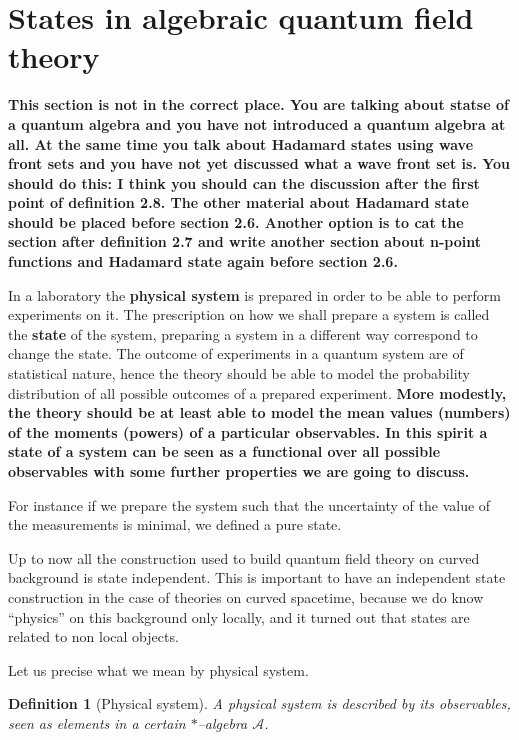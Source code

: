 \documentclass[11pt]{book}
\newcommand{\com}[1]{{\color{red}\bf #1}}
\newcommand{\Acal}{\mathcal{A}}
\theoremstyle{break}
\newtheorem{definition}{Definition}[chapter]
\begin{document}
\section{States in algebraic quantum field theory}
\label{p:STATES}

\com{This section is not in the correct place. You are talking about statse of a quantum algebra and you have not introduced a quantum algebra at all. At the same time you talk about Hadamard states using wave front sets and you have not yet discussed what a wave front set is. 
You should do this:
I think you should can the discussion after the first point of definition 2.8. The other material about Hadamard state should be placed before 
section 2.6.   Another option is to cat the section after definition 2.7 and write another section about n-point functions and Hadamard state again before section 2.6.}


In a laboratory the \textbf{physical system} is prepared in order to be able to perform experiments on it. The prescription on how we shall prepare a system is called the \textbf{state} of the system, preparing a system in a different way correspond to change the state. The outcome of experiments in a quantum system are of statistical nature, hence the theory should be able to model the probability distribution of all possible outcomes of a prepared experiment. 
\com{More modestly, the theory should be at least able to model the mean values (numbers) of the moments (powers) of a particular observables. In this spirit a state of a system can be seen as a functional over all possible observables with some further properties we are going to discuss.}


For instance if we prepare the system such that the uncertainty of the value of the measurements is minimal, we defined a pure state. 


Up to now all the construction used to build quantum field theory on curved background is state independent. This is important to have an independent state construction in the case of theories on curved spacetime, because we do know ``physics''  on this background only locally, and it turned out that states are related to non local objects.


Let us precise what we mean by physical system.


\begin{definition}[Physical system] 
A physical system is described by its observables, seen as elements in a certain $\ast$--algebra $\Acal$.
\end{definition}
\end{document}
